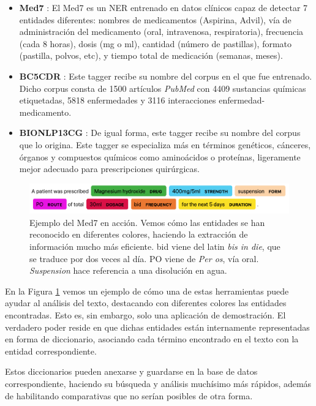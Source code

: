 \begin{itemize}
	\item \textbf{Med7} \cite{med7}: El Med7 es un NER entrenado en datos clínicos capaz de detectar 7 entidades diferentes: nombres de medicamentos (Aspirina, Advil), vía de administración del medicamento (oral, intravenosa, respiratoria), frecuencia (cada 8 horas), dosis (mg o ml), cantidad (número de pastillas), formato (pastilla, polvos, etc), y tiempo total de medicación (semanas, meses). 
	\item \textbf{BC5CDR} \cite{bc5cdr}: Este tagger recibe su nombre del corpus en el que fue entrenado. Dicho corpus consta de 1500 artículos \textit{PubMed} con 4409 sustancias químicas etiquetadas, 5818 enfermedades y 3116 interacciones enfermedad-medicamento.
	\item \textbf{BIONLP13CG} \cite{BIONLP13CG}: De igual forma, este tagger recibe su nombre del corpus que lo origina. Este tagger se especializa más en términos genéticos, cánceres, órganos y compuestos químicos como aminoácidos o proteínas, ligeramente mejor adecuado para prescripciones quirúrgicas.
\end{itemize}

\begin{figure}[h]
	\centering
	\includegraphics[width=.9\textwidth]{media/med7_example.png}
	\caption{Ejemplo del Med7 en acción. Vemos cómo las entidades se han reconocido en diferentes colores, haciendo la extracción de información mucho más eficiente. bid viene del latin \textit{bis in die}, que se traduce por dos veces al día. PO viene de \textit{Per os}, vía oral. \textit{Suspension} hace referencia a una disolución en agua.}
	\label{fig:med7}
\end{figure}

En la Figura \ref{fig:med7} vemos un ejemplo de cómo una de estas herramientas puede ayudar al análisis del texto, destacando con diferentes colores las entidades encontradas. Esto es, sin embargo, solo una aplicación de demostración. El verdadero poder reside en que dichas entidades están internamente representadas en forma de diccionario, asociando cada término encontrado en el texto con la entidad correspondiente. 

Estos diccionarios pueden anexarse y guardarse en la base de datos correspondiente, haciendo su búsqueda y análisis muchísimo más rápidos, además de habilitando comparativas que no serían posibles de otra forma.


